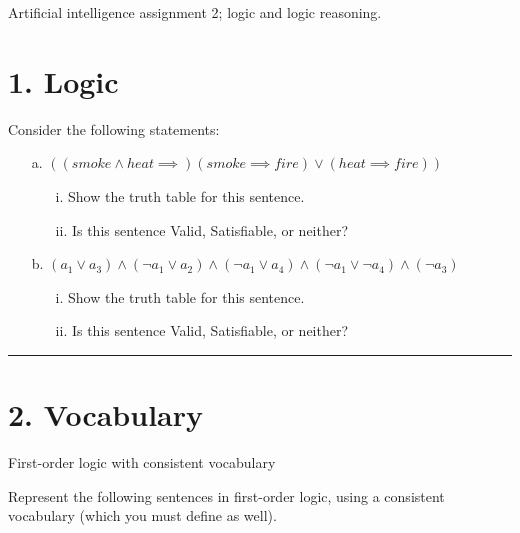 \documentclass[11pt]{article}
\begin{document}
\begin{flushleft}
Artificial intelligence assignment 2; logic and logic reasoning.

\section*{1. Logic}

Consider the following statements:
    \begin{enumerate}

        \item[a.] $((smoke \land heat \implies) (smoke \implies fire) \lor (heat \implies fire))$
            \begin{enumerate} 

                \item[i.] Show the truth table for this sentence.
                \item[ii.] Is this sentence Valid, Satisfiable, or neither?

            \end{enumerate}
        \item[b.] $(a_1 \lor a_3) \land (\neg a_1 \lor a_2) \land (\neg a_1 \lor a_4) \land (\neg a_1 \lor \neg a_4) \land (\neg a_3)$

            \begin{enumerate} 
                \item[i.] Show the truth table for this sentence.
                \item[ii.] Is this sentence Valid, Satisfiable, or neither?
            \end{enumerate}

    \end{enumerate}

\rule[0.1pt]{40em}{1.0pt}

\section*{2. Vocabulary} First-order logic with consistent vocabulary

Represent the following sentences in first-order logic, using a consistent
    vocabulary (which you must define as well).

\begin{enumerate}


\end{enumerate}
\end{flushleft}
\end{document}
